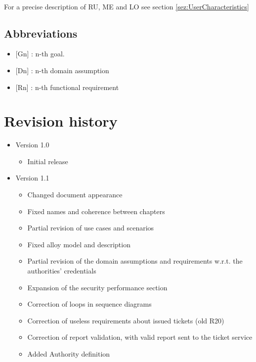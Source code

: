 				\paragraph{}
					For a precise description of RU, ME and LO see section \ref{sez:UserCharacteristics}
					
			\subsection{Abbreviations}
				\begin{itemize}
					\item {[Gn]} : n-th goal.
					\item {[Dn]} : n-th domain assumption
					\item {[Rn]} : n-th functional requirement
				\end{itemize}
		\section{Revision history}
			\begin{itemize}
				\item Version 1.0
					\begin{itemize}
						\item Initial release
					\end{itemize}
				\item Version 1.1
					\begin{itemize}
						\item Changed document appearance
						\item Fixed names and coherence between chapters
						\item Partial revision of use cases and scenarios
						\item Fixed alloy model and description
						\item Partial revision of the domain assumptions and requirements w.r.t. the authorities' credentials
						\item Expansion of the security performance section
						\item Correction of loops in sequence diagrams
						\item Correction of useless requirements about issued tickets (old R20)
						\item Correction of report validation, with valid report sent to the ticket service
						\item Added Authority definition
					\end{itemize}
			\end{itemize}
